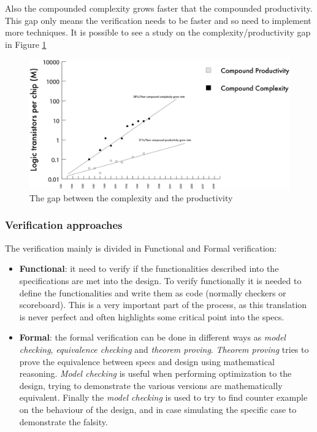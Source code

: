 Also the compounded complexity grows faster that the compounded productivity. This gap only means the verification needs to be faster and so need to implement more techniques.
It is possible to see a study on the complexity/productivity gap in Figure \ref{complexity-gap}
\begin{figure}[H]
    \centering
    \includegraphics[scale = 0.4]{Chapter_1/img/prod-compl.png}
    \caption{The gap between the complexity and the productivity \cite{verification-book-2018}}
    \label{complexity-gap}
\end{figure}

\subsubsection{Verification approaches}
The verification mainly is divided in Functional and Formal verification:
\begin{itemize}
    \item \textbf{Functional}: it need to verify if the functionalities described into the specifications are met into the design. To verify functionally it is needed to define the functionalities and write them as code (normally checkers or scoreboard). This is a very important part of the process, as this translation is never perfect and often highlights some critical point into the specs.
    
    \item \textbf{Formal}: the formal verification can be done in different ways as \textit{model checking}, \textit{equivalence checking} and \textit{theorem proving}. \textit{Theorem proving} tries to prove the equivalence between specs and design using mathematical reasoning. \textit{Model checking} is useful when performing optimization to the design, trying to demonstrate the various versions are mathematically equivalent. Finally the \textit{model checking} is used to try to find counter example on the behaviour of the design, and in case simulating the specific case to demonstrate the falsity.
\end{itemize}

